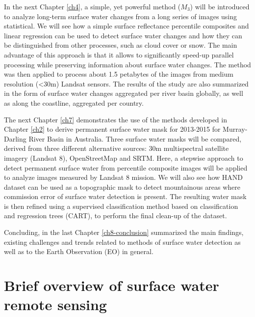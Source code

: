 In the next Chapter \ref{ch4}, a simple, yet powerful method ($M_3$) will be introduced to analyze long-term surface water changes from a long series of images using statistical. We will see how a simple surface reflectance percentile composites and linear regression can be used to detect surface water changes and how they can be distinguished from other processes, such as cloud cover or snow. The main advantage of this approach is that it allows to significantly speed-up parallel processing while preserving information about surface water changes. The method was then applied to process about 1.5 petabytes of the images from medium resolution (<30m) Landsat sensors. The results of the study are also summarized in the form of surface water changes aggregated per river basin globally, as well as along the coastline, aggregated per country.

The next Chapter \ref{ch7} demonstrates the use of the methods developed in Chapter \ref{ch2} to derive permanent surface water mask for 2013-2015 for Murray-Darling River Basin in Australia. Three surface water masks will be compared, derived from three different alternative sources: 30m multispectral satellite imagery (Landsat 8), OpenStreetMap and SRTM. Here, a stepwise approach to detect permanent surface water from percentile composite images will be applied to analyze images measured by Landsat 8 mission. We will also see how HAND dataset can be used as a topographic mask to detect mountainous areas where commission error of surface water detection is present. The resulting water mask is then refined using a supervised classification method based on classification and regression trees (CART), to perform the final clean-up of the dataset.

Concluding, in the last Chapter \ref{ch8-conclusion} summarized the main findings, existing challenges and trends related to methods of surface water detection as well as to the Earth Observation (EO) in general.



\chapter{Brief overview of surface water remote sensing}

\label{ch1}

